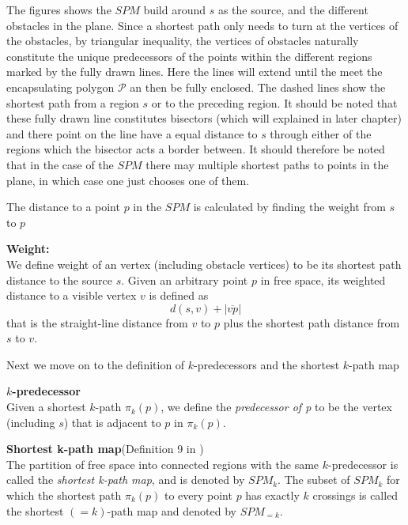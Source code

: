 The figures shows the $SPM$ build around $s$ as the source, and the different obstacles in the plane. 
Since a shortest path only needs to turn at the vertices of the obstacles, by triangular inequality, 
the vertices of obstacles naturally constitute the unique predecessors of the points within the different 
regions marked by the fully drawn lines. Here the lines will extend until the meet the encapsulating 
polygon $\mathcal{P}$ an then be fully enclosed. The dashed lines show the shortest path from a region 
$s$ or to the preceding region. It should be noted that these fully drawn line constitutes bisectors 
(which will explained in later chapter) and there point on the line have a equal distance to $s$ through 
either of the regions which the bisector acts a border between. It should therefore be noted that in the 
case of the $SPM$ there may multiple shortest paths to points in the plane, in which case one just chooses 
one of them.

The distance to a point $p$ in the $SPM$ is calculated by finding the weight from $s$ to $p$

\begin{mydef}
	\textbf{Weight:} \\ 
	We define weight of an vertex (including obstacle vertices) to be
	its shortest path distance to the source $s$. Given an arbitrary point $p$
	in free space, its weighted distance to a visible vertex $v$ is defined as
	$$d(s,v) + \left| \overline{vp} \right|$$
	that is the straight-line distance from $v$ to $p$ plus the shortest path 
	distance from $s$ to $v$.
	\cite{HershbergerS99} 
\end{mydef}

Next we move on to the definition of $k$-predecessors and the shortest $k$-path map

\begin{mydef}
	\textbf{$k$-predecessor}\\ 
	Given a shortest $k$-path $\pi_k(p)$, we define the \textit{predecessor of
	p} to be the vertex (including $s$) that is adjacent to $p$ in
	$\pi_k(p)$\cite{HershbergerKS17}. 
\end{mydef}

\begin{mydef}
	\textbf{Shortest k-path map}(Definition 9 in \cite{HershbergerKS17})\\
	The partition of free space into connected regions with the same
	$k$-predecessor is called the \textit{shortest k-path map}, and is denoted
	by $SPM_k$. The subset of $SPM_k$ for which the shortest path $\pi_k(p)$ to
	every point $p$ has exactly $k$ crossings is called the shortest $(=k)$-path
	map and denoted by $SPM_{=k}$. 
\end{mydef}

